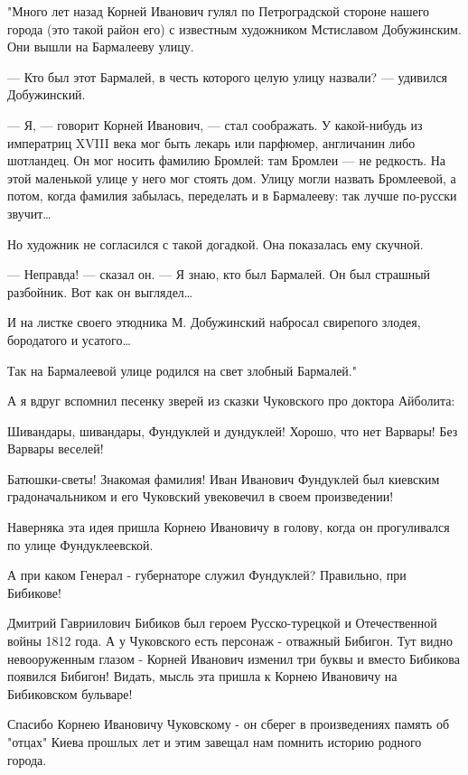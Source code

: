 "Много лет назад Корней Иванович гулял по Петроградской стороне нашего города
(это такой район его) с известным художником Мстиславом Добужинским. Они вышли
на Бармалееву улицу.

— Кто был этот Бармалей, в честь которого целую улицу назвали? — удивился Добужинский.

— Я, — говорит Корней Иванович, — стал соображать. У какой-нибудь из императриц
XVIII века мог быть лекарь или парфюмер, англичанин либо шотландец. Он мог
носить фамилию Бромлей: там Бромлеи — не редкость. На этой маленькой улице у
него мог стоять дом. Улицу могли назвать Бромлеевой, а потом, когда фамилия
забылась, переделать и в Бармалееву: так лучше по-русски звучит…

Но художник не согласился с такой догадкой. Она показалась ему скучной.

— Неправда! — сказал он. — Я знаю, кто был Бармалей. Он был страшный разбойник.
Вот как он выглядел…

И на листке своего этюдника М. Добужинский набросал свирепого злодея,
бородатого и усатого…

Так на Бармалеевой улице родился на свет злобный Бармалей."

А я вдруг вспомнил песенку зверей из сказки Чуковского про доктора Айболита:

\obeycr
Шивандары, шивандары,
Фундуклей и дундуклей!
Хорошо, что нет Варвары!
Без Варвары веселей! 
\restorecr

Батюшки-светы! Знакомая фамилия! Иван Иванович Фундуклей был киевским
градоначальником и его Чуковский увековечил в своем произведении!

Наверняка эта идея пришла Корнею Ивановичу в голову, когда он прогуливался по
улице Фундуклеевской.

А при каком Генерал - губернаторе служил Фундуклей? Правильно, при Бибикове! 

Дмитрий Гавриилович Бибиков был героем Русско-турецкой и Отечественной войны
1812 года. А у Чуковского есть персонаж - отважный Бибигон. Тут видно
невооруженным глазом - Корней Иванович изменил три буквы и вместо Бибикова
появился Бибигон! Видать, мысль эта пришла к Корнею Ивановичу на Бибиковском
бульваре!

Спасибо Корнею Ивановичу Чуковскому - он сберег в произведениях память об
"отцах" Киева прошлых лет и этим завещал нам помнить историю родного города.
